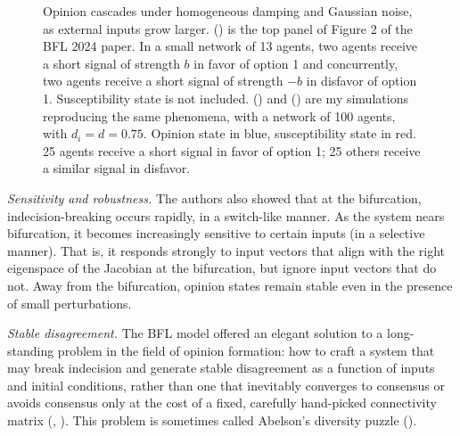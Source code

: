 \documentclass[]{article}
\begin{document}
\begin{figure}
	\caption{Opinion cascades under homogeneous damping and Gaussian noise, as external inputs grow larger. () is the top panel of Figure 2 of the BFL 2024 paper. In a small network of 13 agents, two agents receive a short signal of strength $b$ in favor of option 1 and concurrently, two agents receive a short signal of strength $-b$ in disfavor of option 1. Susceptibility state is not included. () and () are my simulations reproducing the same phenomena, with a network of 100 agents, with $d_i=d=0.75$. Opinion state in blue, susceptibility state in red. 25 agents receive a short signal in favor of option 1; 25 others receive a similar signal in disfavor. }\label{fig:replication}
\end{figure}

\textit{Sensitivity and robustness.} The authors also showed that at the bifurcation, indecision-breaking occurs rapidly, in a switch-like manner. As the system nears bifurcation, it becomes increasingly sensitive to certain inputs (in a selective manner). That is, it responds strongly to input vectors that align with the right eigenspace of the Jacobian at the bifurcation, but ignore input vectors that do not. Away from the bifurcation, opinion states remain stable even in the presence of small perturbations.

\textit{Stable disagreement.} The BFL model offered an elegant solution to a long-standing problem in the field of opinion formation: how to craft a system that may break indecision and generate stable disagreement as a function of inputs and initial conditions, rather than one that inevitably converges to consensus or avoids consensus only at the cost of a fixed, carefully hand-picked connectivity matrix (\cite{ravazziDynamicalSocialNetworks2021}, \cite{bernardoBoundedConfidenceOpinion2024}). This problem is sometimes called Abelson's diversity puzzle (\cite{abelsonMathematicalModelsDistribution1964}). 
\end{document}
